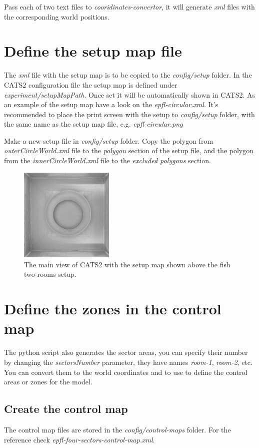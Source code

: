 \documentclass{styles/assisi}
\begin{document}
Pass each of two text files to {\it cooridinates-convertor}, it will generate {\it xml} files with the corresponding world positions.

\section{Define the setup map file}
The {\it xml} file with the setup map is to be copied to the {\it config/setup} folder. In the CATS2 configuration file the setup map is defined under {\it experiment/setupMapPath}. Once set it will be automatically shown in CATS2. As an example of the setup map have a look on the {\it epfl-circular.xml}. It's recommended to place the print screen with the setup to  {\it config/setup} folder, with the same name as the setup map file, e.g. {\it epfl-circular.png}

Make a new setup file in {\it config/setup} folder. Copy the polygon from {\it outerCircleWorld.xml} file to the {\it polygon} section of the setup file, and the polygon from the {\it innerCircleWorld.xml} file to the {\it excluded polygons} section.  

\begin{figure}[ht]
\centering
\includegraphics[width=0.4\textwidth]{./figs/epfl-circular.png}
\caption{The main view of CATS2 with the setup map shown above the fish two-rooms setup.}
\label{fig:setup-map}
\end{figure}

\section{Define the zones in the control map}
The python script also generates the sector areas, you can specify their number by changing the {\it sectorsNumber} parameter, they have names {\it room-1}, {\it room-2}, etc. You can convert them to the world coordinates and to use to define the control areas or zones for the model. 

\subsection{Create the control map}
The control map files are stored in the {\it config/control-maps} folder. For the reference check {\it epfl-four-sectors-control-map.xml}. 
\end{document}

